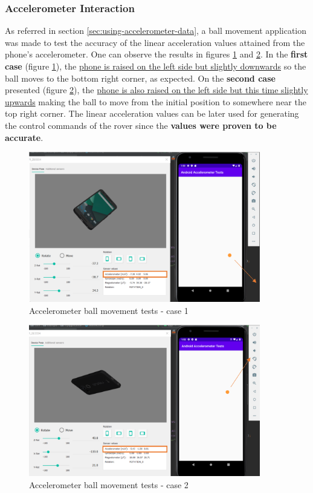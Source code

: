 %
\subsubsection{Accelerometer Interaction}
\label{sec:accelerometer-using-data-test}
%
As referred in section \ref{sec:using-accelerometer-data}, a ball movement application was made to test the accuracy of the linear acceleration values attained from the phone's accelerometer. One can observe the results in figures \ref{fig:ball-mov-test1} and \ref{fig:ball-mov-test2}. In the \textbf{first case} (figure \ref{fig:ball-mov-test1}), the \underline{phone is raised on the left side but slightly downwards} so the ball moves to the bottom right corner, as expected. On the \textbf{second case} presented (figure \ref{fig:ball-mov-test2}), the \underline{phone is also raised on the left side but this time slightly upwards} making the ball to move from the initial position to somewhere near the top right corner. The linear acceleration values can be later used for generating the control commands of the rover since the \textbf{values were proven to be accurate}.
%
\begin{figure}[!ht]
\centering
\includegraphics[width=0.9\textwidth]{img/ball-mov-test1.png}
\caption{\label{fig:ball-mov-test1}Accelerometer ball movement tests - case 1}
\end{figure}
%
\begin{figure}[!ht]
\centering
\includegraphics[width=0.9\textwidth]{img/ball-mov-test2.png}
\caption{\label{fig:ball-mov-test2}Accelerometer ball movement tests - case 2}
\end{figure}